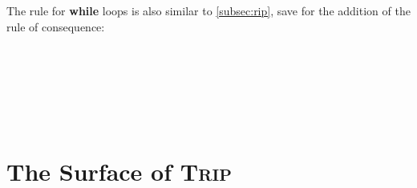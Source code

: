 \documentclass[sigplan]{acmart}%
\begin{document}
The rule for \textbf{while} loops is also similar to \autoref{subsec:rip}, save 
for the addition of the rule of consequence:
\begin{code}
\>[2]\AgdaSpace{}%
\AgdaSymbol{:}\AgdaSpace{}%
\AgdaSymbol{(}\AgdaSpace{}%
\AgdaSymbol{:}\AgdaSpace{}%
\AgdaSymbol{)}\AgdaSpace{}%
\AgdaSpace{}%
\AgdaOperator{\AgdaDatatype{[}}\AgdaSpace{}%
\AgdaSpace{}%
\AgdaSpace{}%
\AgdaSpace{}%
\AgdaOperator{\AgdaDatatype{,}}\AgdaSpace{}%
\AgdaSpace{}%
\AgdaOperator{\AgdaDatatype{]}}\AgdaSpace{}%
\AgdaSpace{}%
\AgdaOperator{\AgdaDatatype{[}}\AgdaSpace{}%
\AgdaSpace{}%
\AgdaOperator{\AgdaDatatype{,}}\AgdaSpace{}%
\AgdaSpace{}%
\AgdaSpace{}%
\AgdaSpace{}%
\AgdaSpace{}%
\AgdaOperator{\AgdaDatatype{]}}\<%
\\
%
\>[2]\AgdaSpace{}%
\AgdaSpace{}%
\AgdaSpace{}%
\AgdaSymbol{=}\AgdaSpace{}%
%
\>[1011I]\AgdaSymbol{(}\AgdaSpace{}%
\AgdaSymbol{(}%
\>[1013I]\AgdaSymbol{(}%
\>[1014I]\AgdaSymbol{(}\AgdaSpace{}%
\AgdaSymbol{(}\AgdaSpace{}%
\AgdaOperator{\AgdaInductiveConstructor{\AgdaUnderscore{},\AgdaUnderscore{}}}\AgdaSymbol{))}\<%
\\
\>[.][@{}l@{}]\<[1014I]%
\>[34]\AgdaSymbol{(}\AgdaSpace{}%
\AgdaSymbol{))}\<%
\\
\>[.][@{}l@{}]\<[1013I]%
\>[29]\AgdaSymbol{))}\<%
\\
\>[.][@{}l@{}]\<[1011I]%
\>[18]\AgdaSymbol{(}%
\>[1018I]\AgdaSymbol{(}\AgdaSpace{}%
\AgdaSymbol{(}\AgdaSpace{}%
\AgdaOperator{\AgdaInductiveConstructor{\AgdaUnderscore{},\AgdaUnderscore{}}}\AgdaSymbol{))}\<%
\\
\>[.][@{}l@{}]\<[1018I]%
\>[23]\AgdaSymbol{(}\AgdaSpace{}%
\AgdaSymbol{(}\AgdaSpace{}%
\AgdaSymbol{)))}\<%
\end{code}

\section{The Surface of \textsc{Trip}}\label{sec:surface}
\end{document}
